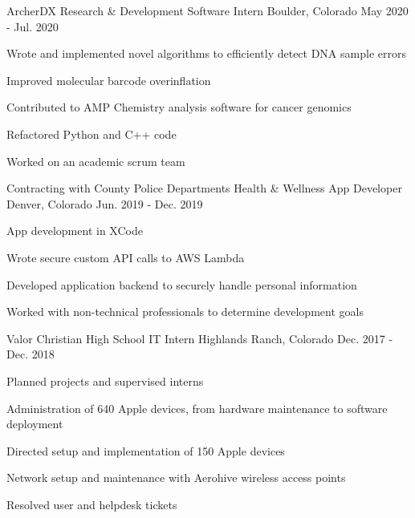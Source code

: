 


\begin{cventries}

  \cventry
    {ArcherDX}
    {Research \& Development Software Intern}
    {Boulder, Colorado}
    {May 2020 - Jul. 2020}
    {
      \begin{cvitems}
        \item{Wrote and implemented novel algorithms to efficiently detect DNA sample errors}
        \item{Improved molecular barcode overinflation}
        \item{Contributed to AMP Chemistry analysis software for cancer genomics}
        \item{Refactored Python and C++ code}
        \item{Worked on an academic scrum team}
      \end{cvitems}
    }

  \cventry
    {Contracting with County Police Departments} %
    {Health \& Wellness App Developer} %
    {Denver, Colorado} %
    {Jun. 2019 - Dec. 2019} %
    {
      \begin{cvitems} %
        \item {App development in XCode}
        \item {Wrote secure custom API calls to AWS Lambda}
        \item {Developed application backend to securely handle personal information}
        \item {Worked with non-technical professionals to determine development goals}
      \end{cvitems}
    }

  \cventry
    {Valor Christian High School} %
    {IT Intern} %
    {Highlands Ranch, Colorado} %
    {Dec. 2017 - Dec. 2018} %
    {
      \begin{cvitems} %
        \item {Planned projects and supervised interns}
        \item {Administration of 640 Apple devices, from hardware maintenance to software deployment}
        \item {Directed setup and implementation of 150 Apple devices}
        \item {Network setup and maintenance with Aerohive wireless access points}
        \item {Resolved user and helpdesk tickets}
      \end{cvitems}
    }

\end{cventries}
